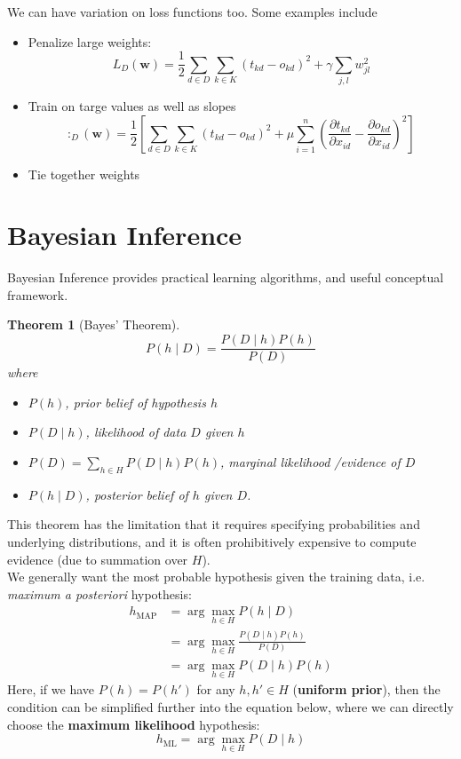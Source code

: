 \documentclass[12pt]{article}
\newtheorem{theorem}{Theorem}[section]
\theoremstyle{definition}
\begin{document}
We can have variation on loss functions too. Some examples include
\begin{itemize}
	\item Penalize large weights:
	\[
L_D(\mathbf{w})=\frac{1}{2}\sum_{d\in D}\sum_{k\in K} (t_{kd}-o_{kd})^2 +\gamma \sum_{j, l} w_{jl}^2
	\]
	\item Train on targe values as well as slopes
	\[
:_D(\mathbf{w})=\frac{1}{2}\left[\sum_{d\in D}\sum_{k\in K} (t_{kd}-o_{kd})^2 + \mu\sum_{i=1}^n (\frac{\partial t_{kd}}{\partial x_{id}}-\frac{\partial o_{kd}}{\partial x_{id}})^2\right]
	\]
	\item Tie together weights
\end{itemize}
\section{Bayesian Inference}
Bayesian Inference provides practical learning algorithms, and useful conceptual framework.
\begin{theorem}[Bayes' Theorem]
\normalfont 
\[
P(h\mid D) = \frac{P(D\mid h)P(h)}{P(D)}
\]
where
\begin{itemize}
	\item $P(h)$, prior belief of hypothesis $h$
	\item $P(D\mid h)$, likelihood of data $D$ given $h$
	\item $P(D)=\sum_{h\in H}P(D\mid h)P(h)$, marginal likelihood /evidence of $D$
	\item $P(h\mid D)$, posterior belief of $h$ given $D$.
\end{itemize}
\end{theorem}
This theorem has the limitation that it requires specifying probabilities and underlying distributions, and it is often prohibitively expensive to compute evidence (due to summation over $H$).\\
We generally want the most probable hypothesis given the training data, i.e. \textit{maximum a posteriori} hypothesis:
\begin{align*}
h_{\text{MAP}}&=\arg\max_{h\in H} P(h\mid D)\\
&=\arg\max_{h\in H} \frac{P(D\mid h)P(h)}{P(D)}\\
&=\arg\max_{h\in H}P(D\mid h)P(h) 
\end{align*}
Here, if we have $P(h)=P(h')$ for any $h, h'\in H$ (\textbf{uniform prior}), then the condition can be simplified further into the equation below, where we can directly choose the \textbf{maximum likelihood} hypothesis:
\[
h_{\text{ML}}=\arg\max_{h\in H}P(D\mid h)
\]
\end{document}
